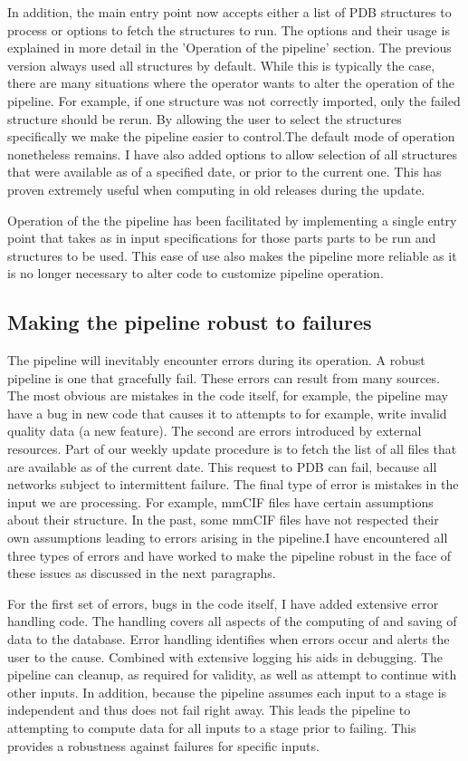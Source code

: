 In addition, the main entry point now accepts either a list of PDB structures to
process or options to fetch the structures to run. The options and their usage
is explained in more detail in the 'Operation of the pipeline' section. The
previous version always used all structures by default. While this is typically
the case, there are many situations where the operator wants to alter the
operation of the pipeline. For example, if one structure was not correctly
imported, only the failed structure should be rerun. By allowing the user to
select the structures specifically we make the pipeline easier to control.The
default mode of operation nonetheless remains. I have also added options to
allow selection of all structures that were available as of a specified date, or
prior to the current one. This has proven extremely useful when computing in old
releases during the update.

Operation of the the pipeline has been facilitated by implementing a single
entry point that takes as in input specifications for those parts parts to be
run and structures to be used. This ease of use also makes the pipeline more
reliable as it is no longer necessary to alter code to customize pipeline
operation.

\subsection{Making the pipeline robust to failures}

The pipeline will inevitably encounter errors during its operation. A robust
pipeline is one that gracefully fail. These errors can result from many sources.
The most obvious are mistakes in the code itself, for example, the pipeline may
have a bug in new code that causes it to attempts to for example, write invalid
quality data (a new feature). The second are errors introduced by external
resources. Part of our weekly update procedure is to fetch the list of all files
that are available as of the current date. This request to PDB can fail, because
all networks subject to intermittent failure. The final type of error is
mistakes in the input we are processing. For example, mmCIF files have certain
assumptions about their structure. In the past, some mmCIF files have not
respected their own assumptions leading to errors arising in the pipeline.I have
encountered all three types of errors and have worked to make the pipeline
robust in the face of these issues as discussed in the next paragraphs.

For the first set of errors, bugs in the code itself, I have added extensive
error handling code. The handling covers all aspects of the computing of and
saving of data to the database. Error handling identifies when errors occur and
alerts the user to the cause. Combined with extensive logging his aids in
debugging. The pipeline can cleanup, as required for validity, as well as
attempt to continue with other inputs. In addition, because the pipeline assumes
each input to a stage is independent and thus does not fail right away. This
leads the pipeline to attempting to compute data for all inputs to a stage prior
to failing. This provides a robustness against failures for specific inputs.

